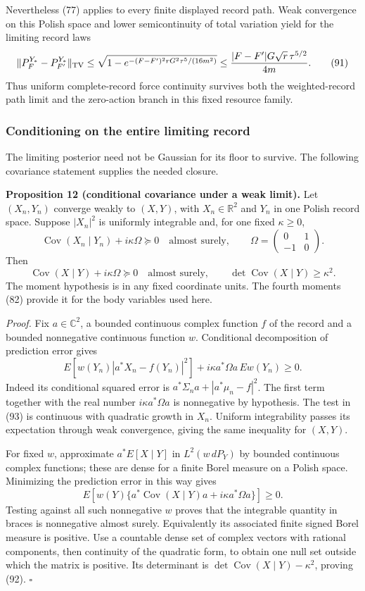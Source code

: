 \documentclass[11pt,a4paper]{article}
\begin{document}
Nevertheless (77) applies to every finite displayed record path. Weak
convergence on this Polish space and lower semicontinuity of total
variation yield for the limiting record laws
\[\|P_F^{Y_*}-P_{F'}^{Y_*}\|_{\rm TV}
\le\sqrt{1-e^{-(F-F')^2rG^2\tau^5/(16m^2)}}
\le\frac{|F-F'|G\sqrt r\,\tau^{5/2}}{4m}.\tag{91}\] Thus uniform
complete-record force continuity survives both the weighted-record path
limit and the zero-action branch in this fixed resource family.

\hypertarget{conditioning-on-the-entire-limiting-record}{%
\subsubsection{Conditioning on the entire limiting
record}\label{conditioning-on-the-entire-limiting-record}}

The limiting posterior need not be Gaussian for its floor to survive.
The following covariance statement supplies the needed closure.

\textbf{Proposition 12 (conditional covariance under a weak limit).} Let
\((X_n,Y_n)\) converge weakly to \((X,Y)\), with \(X_n\in\mathbb R^2\)
and \(Y_n\) in one Polish record space. Suppose \(|X_n|^2\) is uniformly
integrable and, for one fixed \(\kappa\ge0\),
\[\operatorname{Cov}(X_n\mid Y_n)+i\kappa\Omega\succeq0
\quad\text{almost surely},\qquad
\Omega=\begin{pmatrix}0&1\\-1&0\end{pmatrix}.\] Then
\[\operatorname{Cov}(X\mid Y)+i\kappa\Omega\succeq0
\quad\text{almost surely},\qquad
\det\operatorname{Cov}(X\mid Y)\ge\kappa^2.\tag{92}\] The moment
hypothesis is in any fixed coordinate units. The fourth moments (82)
provide it for the body variables used here.

\emph{Proof.} Fix \(a\in\mathbb C^2\), a bounded continuous complex
function \(f\) of the record and a bounded nonnegative continuous
function \(w\). Conditional decomposition of prediction error gives
\[E[w(Y_n)|a^*X_n-f(Y_n)|^2]
 +i\kappa a^*\Omega a\,Ew(Y_n)\ge0.\tag{93}\] Indeed its conditional
squared error is \(a^*\Sigma_na+|a^*\mu_n-f|^2\). The first term
together with the real number \(i\kappa a^*\Omega a\) is nonnegative by
hypothesis. The test in (93) is continuous with quadratic growth in
\(X_n\). Uniform integrability passes its expectation through weak
convergence, giving the same inequality for \((X,Y)\).

For fixed \(w\), approximate \(a^*E[X\mid Y]\) in \(L^2(w\,dP_Y)\) by
bounded continuous complex functions; these are dense for a finite Borel
measure on a Polish space. Minimizing the prediction error in this way
gives \[E[w(Y)\{a^*\operatorname{Cov}(X\mid Y)a
                              +i\kappa a^*\Omega a\}]\ge0.\] Testing
against all such nonnegative \(w\) proves that the integrable quantity
in braces is nonnegative almost surely. Equivalently its associated
finite signed Borel measure is positive. Use a countable dense set of
complex vectors with rational components, then continuity of the
quadratic form, to obtain one null set outside which the matrix is
positive. Its determinant is
\(\det\operatorname{Cov}(X\mid Y)-\kappa^2\), proving (92). \(\square\)
\end{document}
